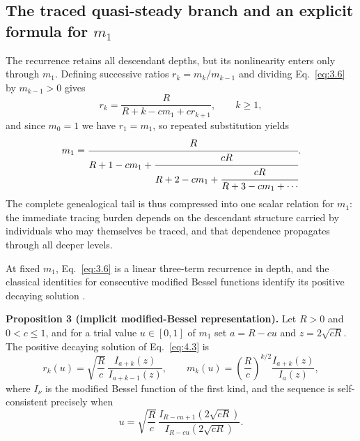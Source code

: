 \documentclass[review,12pt]{elsarticle}
\numberwithin{equation}{section}
\theoremstyle{remark}
\begin{document}
\subsection{The traced quasi-steady branch and an explicit formula for $m_1$}\label{subsec3.2}

The recurrence retains all descendant depths, but its nonlinearity enters only through $m_1$. Defining successive ratios $r_k=m_k/m_{k-1}$ and dividing Eq.~\eqref{eq:3.6} by $m_{k-1}>0$ gives
\begin{equation}
r_k = \frac{R}{R+k-cm_1+cr_{k+1}}, \qquad k\geq1,
\label{eq:4.3}
\end{equation}
and since $m_0=1$ we have $r_1=m_1$, so repeated substitution yields
\begin{equation}
m_1 = \cfrac{R}{R+1-cm_1+\cfrac{cR}{R+2-cm_1+\cfrac{cR}{R+3-cm_1+\cdots}}}.
\label{eq:4.4}
\end{equation}
The complete genealogical tail is thus compressed into one scalar relation for $m_1$: the immediate tracing burden depends on the descendant structure carried by individuals who may themselves be traced, and that dependence propagates through all deeper levels.

At fixed $m_1$, Eq.~\eqref{eq:3.6} is a linear three-term recurrence in depth, and the classical identities for consecutive modified Bessel functions identify its positive decaying solution \cite{gautschi1967,olver2010}.

\textbf{Proposition 3 (implicit modified-Bessel representation).} Let $R>0$ and $0<c\leq1$, and for a trial value $u\in[0,1]$ of $m_1$ set $a=R-cu$ and $z=2\sqrt{cR}$. The positive decaying solution of Eq.~\eqref{eq:4.3} is
\begin{equation}
r_k(u) = \sqrt{\frac{R}{c}}\,\frac{I_{a+k}(z)}{I_{a+k-1}(z)}, \qquad
m_k(u) = \left(\frac{R}{c}\right)^{k/2} \frac{I_{a+k}(z)}{I_a(z)},
\label{eq:4.7}
\end{equation}
where $I_\nu$ is the modified Bessel function of the first kind, and the sequence is self-consistent precisely when
\begin{equation}
u = \sqrt{\frac{R}{c}}\,\frac{I_{R-cu+1}\!\left(2\sqrt{cR}\right)}{I_{R-cu}\!\left(2\sqrt{cR}\right)}.
\label{eq:4.8}
\end{equation}
\end{document}
